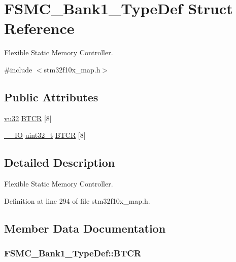 \hypertarget{struct_f_s_m_c___bank1___type_def}{}\section{F\+S\+M\+C\+\_\+\+Bank1\+\_\+\+Type\+Def Struct Reference}
\label{struct_f_s_m_c___bank1___type_def}


Flexible Static Memory Controller.  




{\ttfamily \#include $<$stm32f10x\+\_\+map.\+h$>$}

\subsection*{Public Attributes}
\begin{DoxyCompactItemize}
\item 
\hyperlink{agilefox_2library_2inc_2stm32f10x__type_8h_a6e2761f0a1011f84ed96b946f2c8a563}{vu32} \hyperlink{struct_f_s_m_c___bank1___type_def_a24c51fc773963dd61e7ef8012368fa21}{B\+T\+CR} \mbox{[}8\mbox{]}
\item 
\hyperlink{group___c_m_s_i_s___c_m3__core__definitions_gaec43007d9998a0a0e01faede4133d6be}{\+\_\+\+\_\+\+IO} \hyperlink{_p_e___types_8h_a33594304e786b158f3fb30289278f5af}{uint32\+\_\+t} \hyperlink{struct_f_s_m_c___bank1___type_def_a6d3aefd66a99e71ae4a22444a507a720}{B\+T\+CR} \mbox{[}8\mbox{]}
\end{DoxyCompactItemize}


\subsection{Detailed Description}
Flexible Static Memory Controller. 

Definition at line 294 of file stm32f10x\+\_\+map.\+h.



\subsection{Member Data Documentation}
\subsubsection[{\texorpdfstring{B\+T\+CR}{BTCR}}]{ F\+S\+M\+C\+\_\+\+Bank1\+\_\+\+Type\+Def\+::\+B\+T\+CR}\hypertarget{struct_f_s_m_c___bank1___type_def_a24c51fc773963dd61e7ef8012368fa21}{}\label{struct_f_s_m_c___bank1___type_def_a24c51fc773963dd61e7ef8012368fa21}


